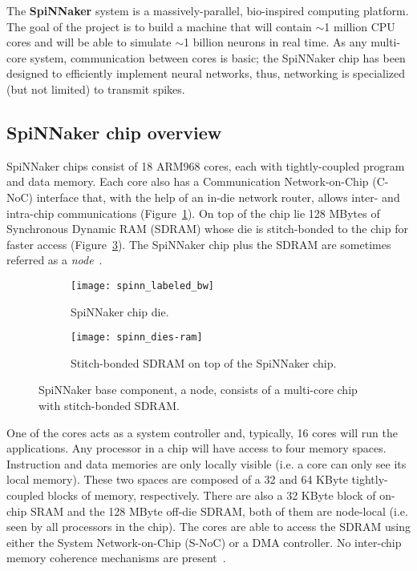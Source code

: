 The \textbf{SpiNNaker} system is a massively-parallel, bio-inspired computing platform. The goal of the project is to build a machine that will contain $\sim$1 million CPU cores and will be able to simulate $\sim$1 billion neurons in real time. As any multi-core system, communication between cores is basic; the SpiNNaker chip has been designed to efficiently implement neural networks, thus, networking is specialized (but not limited) to transmit spikes.

\subsection{SpiNNaker chip overview}

SpiNNaker chips consist of 18 ARM968 cores, each with tightly-coupled program and data memory. Each core also has a Communication Network-on-Chip (C-NoC) interface that, with the help of an in-die network router, allows inter- and intra-chip communications (Figure~\ref{fig:hw:spinnaker-die}). On top of the chip lie 128 MBytes of Synchronous Dynamic RAM (SDRAM) whose die is stitch-bonded to the chip for faster access (Figure~\ref{fig:hw:bonded-sdram}). The SpiNNaker chip plus the SDRAM are sometimes referred as a \emph{node}~\cite{furber2013overview}.

\begin{figure}[h]
  \begin{center}
    \begin{subfigure}[b]{0.55\textwidth}
      \texttt{[image: spinn\_labeled\_bw]}
      \caption{SpiNNaker chip die.}
      \label{fig:hw:spinnaker-die}
    \end{subfigure}
    \hspace*{0.3cm}
    \begin{subfigure}[b]{0.4\textwidth}
      \texttt{[image: spinn\_dies-ram]}
      \caption{Stitch-bonded SDRAM on top of the SpiNNaker chip.}
      \label{fig:hw:bonded-sdram}
    \end{subfigure}
    \caption{SpiNNaker base component, a node, consists of a multi-core chip with stitch-bonded SDRAM.}
  \end{center}
\end{figure}

One of the cores acts as a system controller and, typically, 16 cores will run the applications. Any processor in a chip will have access to four memory spaces. Instruction and data memories are only locally visible (i.e. a core can only see its local memory). These two spaces are composed of a 32 and 64 KByte tightly-coupled blocks of memory, respectively. There are also a 32 KByte block of on-chip SRAM and the 128 MByte off-die SDRAM, both of them are node-local (i.e. seen by all processors in the chip). The cores are able to access the SDRAM using either the System Network-on-Chip (S-NoC) or a DMA controller. No inter-chip memory coherence mechanisms are present~\cite{furber2013overview}.

